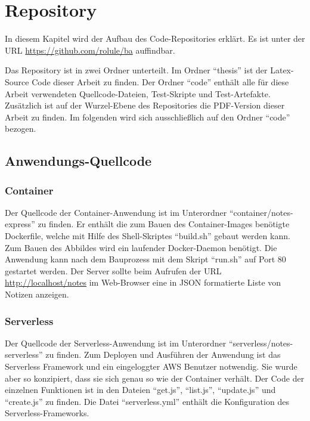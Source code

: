 \chapter{Repository}
\label{apx:repo}
In diesem Kapitel wird der Aufbau des Code-Repositories erklärt. Es ist unter der URL \url{https://github.com/rolule/ba} auffindbar.

Das Repository ist in zwei Ordner unterteilt. Im Ordner "`thesis"' ist der Latex-Source Code dieser Arbeit zu finden. Der Ordner "`code"' enthält alle für diese Arbeit verwendeten Quellcode-Dateien, Test-Skripte und Test-Artefakte. Zusätzlich ist auf der Wurzel-Ebene des Repositories die PDF-Version dieser Arbeit zu finden. Im folgenden wird sich ausschließlich auf den Ordner "`code"' bezogen.

\section{Anwendungs-Quellcode}
\subsection{Container}
Der Quellcode der Container-Anwendung ist im Unterordner \linebreak "`container/notes-express"' zu finden. Er enthält die zum Bauen des Container-Images benötigte Dockerfile, welche mit Hilfe des Shell-Skriptes "`build.sh"' gebaut werden kann. Zum Bauen des Abbildes wird ein laufender Docker-Daemon benötigt. Die Anwendung kann nach dem Bauprozess mit dem Skript "`run.sh"' auf Port 80 gestartet werden. Der Server sollte beim Aufrufen der URL \url{http://localhost/notes} im Web-Browser eine in JSON formatierte Liste von Notizen anzeigen. 

\subsection{Serverless}
Der Quellcode der Serverless-Anwendung ist im Unterordner \linebreak "`serverless/notes-serverless"' zu finden. Zum Deployen und Ausführen der Anwendung ist das Serverless Framework und ein eingeloggter \ac{AWS} Benutzer notwendig. Sie wurde aber so konzipiert, dass sie sich genau so wie der Container verhält. Der Code der einzelnen Funktionen ist in den Dateien "`get.js"', "`list.js"', "`update.js"' und "`create.js"' zu finden. Die Datei "`serverless.yml"' enthält die Konfiguration des Serverless-Frameworks.

